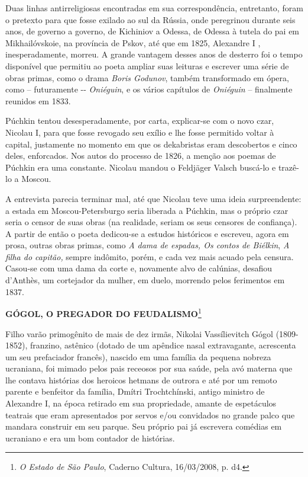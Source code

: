 Duas linhas antirreligiosas encontradas em sua correspondência,
entretanto, foram o pretexto para que fosse exilado ao sul da Rússia,
onde peregrinou durante seis anos, de governo a governo, de Kichiniov a
Odessa, de Odessa à tutela do pai em Mikhailóvskoie, na província de
Pskov, até que em 1825, Alexandre I , inesperadamente, morreu. A grande
vantagem desses anos de desterro foi o tempo disponível que permitiu ao
poeta ampliar suas leituras e escrever uma série de obras primas, como o
drama \emph{Boris Godunov}, também transformado em ópera, como --
futuramente -\/- \emph{Oniéguin}, e os vários capítulos de
\emph{Oniéguin} -- finalmente reunidos em 1833.

Púchkin tentou desesperadamente, por carta, explicar-se com o novo czar,
Nicolau I, para que fosse revogado seu exílio e lhe fosse permitido
voltar à capital, justamente no momento em que os dekabristas eram
descobertos e cinco deles, enforcados. Nos autos do processo de 1826, a
menção aos poemas de Púchkin era uma constante. Nicolau mandou o
Feldjäger Valsch buscá-lo e trazê-lo a Moscou.

A entrevista parecia terminar mal, até que Nicolau teve uma ideia
surpreendente: a estada em Moscou-Petersburgo seria liberada a Púchkin,
mas o próprio czar seria o censor de suas obras (na realidade, seriam os
seus censores de confiança). A partir de então o poeta dedicou-se a
estudos históricos e escreveu, agora em prosa, outras obras primas, como
\emph{A dama de espadas, Os contos de Biélkin}, \emph{A filha do
capitão,} sempre indômito, porém, e cada vez mais acuado pela censura.
Casou-se com uma dama da corte e, novamente alvo de calúnias, desafiou
d'Anthès, um cortejador da mulher, em duelo, morrendo pelos ferimentos
em 1837.

\textbf{GÓGOL, O PREGADOR DO FEUDALISMO}\footnote{\emph{O Estado de São
  Paulo}, Caderno Cultura, 16/03/2008, p. d4.}

Filho varão primogênito de mais de dez irmãs, Nikolai Vassílievitch
Gógol (1809-1852), franzino, astênico (dotado de um apêndice nasal
extravagante, acrescenta um seu prefaciador francês), nascido em uma
família da pequena nobreza ucraniana, foi mimado pelos pais receosos por
sua saúde, pela avó materna que lhe contava histórias dos heroicos
hetmans de outrora e até por um remoto parente e benfeitor da família,
Dmítri Trochtchínski, antigo ministro de Alexandre I, na época retirado
em sua propriedade, amante de espetáculos teatrais que eram apresentados
por servos e/ou convidados no grande palco que mandara construir em seu
parque. Seu próprio pai já escrevera comédias em ucraniano e era um bom
contador de histórias.

